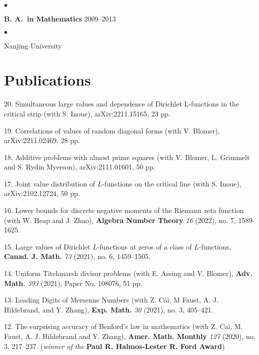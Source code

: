 \documentclass[margin,line,pifont,palatino,courier,10pt]{res}
\newenvironment{list1}{
  \begin{list}{$\bullet$}{%
      \setlength{\itemsep}{0in}
      \setlength{\parsep}{0in} \setlength{\parskip}{0in}
      \setlength{\topsep}{0in} \setlength{\partopsep}{0in}
      \setlength{\leftmargin}{0.17in}}}{\end{list}}
\begin{document}
\begin{resume}
\begin{list1}
\end{list1}

\textbf{B. A.~in Mathematics }\hfill{2009--2013}\\
\vspace*{-.15in}
\begin{list1}
\item[] Nanjing University

\end{list1}






\section{\sc Publications}

20. {Simultaneous large values and dependence of Dirichlet L-functions in the critical strip} (with S. Inoue), arXiv:2211.15165, 23 pp. 

19. {Correlations of values of random diagonal forms} (with V. Blomer), arXiv:2211.02469, 28 pp.


18. {Additive problems with almost prime squares} (with V. Blomer, L.  Grimmelt and S. Rydin Myerson), arXiv:2111.01601, 50 pp. %

17. {Joint value distribution of $L$-functions on the critical line} (with S. Inoue), arXiv:2102.12724, 50 pp. %

16. {Lower bounds for discrete negative moments of the Riemann zeta function (with W. Heap and J. Zhao)}, \textbf{  Algebra Number Theory} \emph{16} (2022), no. 7, 1589-1625.%

15. {Large values of Dirichlet $L$-functions at zeros of a class of $L$-functions}, \textbf{Canad. J. Math. } \emph{ 73} (2021), no. 6, 1459--1505.

14. {Uniform Titchmarsh divisor problems} (with E. Assing and V. Blomer), \textbf{Adv. Math.} \emph{393} (2021), Paper No. 108076, 51 pp. %

13. {Leading Digits of Mersenne Numbers} (with Z. Cai, M Faust, A. J. Hildebrand, and Y. Zhang), \textbf{ Exp. Math.}  \emph{30} (2021), no. 3, 405--421. %

12. {The surprising accuracy of Benford's law in mathematics} (with Z. Cai, M. Faust, A. J. Hildebrand and Y. Zhang), \textbf{ Amer. Math. Monthly}  \emph{127} (2020), no. 3, 217--237.
 (\emph{winner of the} \textbf{Paul R. Halmos-Lester R. Ford Award}) 


\end{resume}
\end{document}
